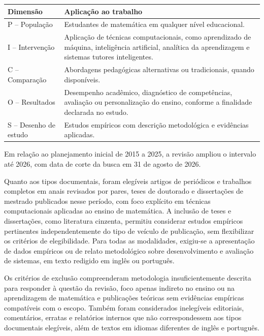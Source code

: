\begin{quadro}[htbp]
\centering
\caption{Dimensões PICOS adaptadas ao escopo da revisão.}
\label{qua:picos}
\begin{tabularx}{\textwidth}{|p{3.5cm}|X|}
\hline
\textbf{Dimensão} & \textbf{Aplicação ao trabalho} \\
\hline
P -- População & Estudantes de matemática em qualquer nível educacional. \\
\hline
I -- Intervenção & Aplicação de técnicas computacionais, como aprendizado de máquina, inteligência artificial, analítica da aprendizagem e sistemas tutores inteligentes. \\
\hline
C -- Comparação & Abordagens pedagógicas alternativas ou tradicionais, quando disponíveis. \\
\hline
O -- Resultados & Desempenho acadêmico, diagnóstico de competências, avaliação ou personalização do ensino, conforme a finalidade declarada no estudo. \\
\hline
S -- Desenho de estudo & Estudos empíricos com descrição metodológica e evidências aplicadas. \\
\hline
\end{tabularx}
\end{quadro}

Em relação ao planejamento inicial de 2015 a 2025, a revisão ampliou o intervalo até 2026, com data de corte da busca em 31 de agosto de 2026.

Quanto aos tipos documentais, foram elegíveis artigos de periódicos e trabalhos completos em anais revisados por pares, teses de doutorado e dissertações de mestrado publicados nesse período, com foco explícito em técnicas computacionais aplicadas ao ensino de matemática. A inclusão de teses e dissertações, como literatura cinzenta, permitiu considerar estudos empíricos pertinentes independentemente do tipo de veículo de publicação, sem flexibilizar os critérios de elegibilidade. Para todas as modalidades, exigiu-se a apresentação de dados empíricos ou de relato metodológico sobre desenvolvimento e avaliação de sistemas, em texto redigido em inglês ou português.

Os critérios de exclusão compreenderam metodologia insuficientemente descrita para responder à questão da revisão, foco apenas indireto no ensino ou na aprendizagem de matemática e publicações teóricas sem evidências empíricas compatíveis com o escopo. Também foram considerados inelegíveis editoriais, comentários, erratas e relatórios internos que não correspondessem aos tipos documentais elegíveis, além de textos em idiomas diferentes de inglês e português.

